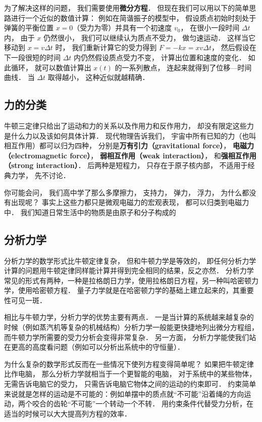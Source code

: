 为了解决这样的问题， 我们需要使用\textbf{微分方程}． 但现在我们可以用以下的简单思路进行一个近似的数值计算： 例如在简谐振子的模型中， 假设质点初始时刻处于弹簧的平衡位置 $x = 0$（受力为零）并具有一个初速度 $v_0$， 在很小一段时间 $\Delta t$ 内， 由于 $x$ 仍然很小， 我们可以继续认为质点不受力， 做匀速运动． 这样当它移动到 $x = v\Delta t$ 时， 我们重新计算它的受力得到 $F = -kx = x v \Delta t$， 然后假设在下一段很短的时间 $\Delta t$ 内仍然假设质点受力不变， 计算出位置和速度的变化． 如此循环， 就可以数值计算出 $x(t)$ 的一系列散点， 连起来就得到了位移—时间曲线． 当 $\Delta t$ 取得越小， 这种近似就越精确．

\subsection{力的分类}
牛顿三定律只给出了运动和力的关系以及作用力和反作用力， 却没有限定这些力是什么力以及该如何具体计算． 现代物理告诉我们， 宇宙中所有已知的力（也叫相互作用）都可以归为四种， 分别是\textbf{万有引力（gravitational force）}， \textbf{电磁力（electromagnetic force）}， \textbf{弱相互作用（weak interaction）}， 和\textbf{强相互作用（strong interaction）}． 后两种是短程力， 只存在于原子核内部， 不适用于经典力学， 先不讨论．

你可能会问， 我们高中学了那么多摩擦力， 支持力， 弹力， 浮力， 为什么都没有出现呢？ 事实上这些力都只是微观电磁力的宏观表现， 都可以归类到电磁力中． 我们知道日常生活中的物质是由原子和分子构成的

\subsection{分析力学}
分析力学的数学形式比牛顿定律复杂， 但和牛顿力学是等效的， 即任何分析力学计算的问题用牛顿定律同样能计算并得到完全相同的结果，反之亦然． 分析力学常见的形式有两种，一种是拉格朗日力学，使用拉格朗日方程，另一种叫哈密顿力学，使用哈密顿方程． 量子力学就是在哈密顿力学的基础上建立起来的，其重要性可见一斑．%

相比与牛顿力学，分析力学的优势主要有两点． 一是当计算的系统越来越复杂的时候（例如蒸汽机等复杂的机械结构）分析力学一般能更快捷地列出微分方程组， 而牛顿力学所需要的受力分析会变得非常复杂． 另一方面， 分析力学能使我们站在更高的高度看问题（例如可以分析出系统中的守恒量）．

为什么复杂的数学形式反而在一些情况下使列方程变得简单呢？ 如果把牛顿定律比作电脑， 那么分析力学就相当于一个更智能的电脑， 对于系统中的某些物体， 无需告诉电脑它的受力， 只需告诉电脑它物体之间的运动的约束即可． 约束简单来说就是怎样的运动是不可能的：例如单摆中的质点就“不可能”沿着绳的方向运动，两个咬合的齿轮“不可能”一个转动一个不转． 用约束条件代替受力分析，在适当的时候可以大大提高列方程的效率．

